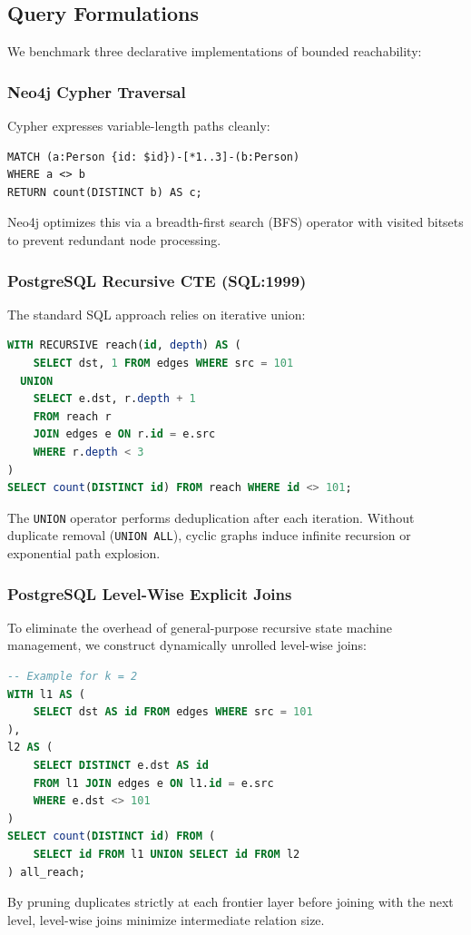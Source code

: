 \documentclass[conference,10pt]{IEEEtran}%
\begin{document}
\subsection{Query Formulations}
We benchmark three declarative implementations of bounded reachability:

\subsubsection{Neo4j Cypher Traversal}
Cypher expresses variable-length paths cleanly:
\begin{lstlisting}
MATCH (a:Person {id: $id})-[*1..3]-(b:Person)
WHERE a <> b
RETURN count(DISTINCT b) AS c;
\end{lstlisting}
Neo4j optimizes this via a breadth-first search (BFS) operator with visited bitsets to prevent redundant node processing.

\subsubsection{PostgreSQL Recursive CTE (SQL:1999)}
The standard SQL approach relies on iterative union:
\begin{lstlisting}[language=SQL]
WITH RECURSIVE reach(id, depth) AS (
    SELECT dst, 1 FROM edges WHERE src = 101
  UNION
    SELECT e.dst, r.depth + 1
    FROM reach r
    JOIN edges e ON r.id = e.src
    WHERE r.depth < 3
)
SELECT count(DISTINCT id) FROM reach WHERE id <> 101;
\end{lstlisting}
The \texttt{UNION} operator performs deduplication after each iteration. Without duplicate removal (\texttt{UNION ALL}), cyclic graphs induce infinite recursion or exponential path explosion.

\subsubsection{PostgreSQL Level-Wise Explicit Joins}
To eliminate the overhead of general-purpose recursive state machine management, we construct dynamically unrolled level-wise joins:
\begin{lstlisting}[language=SQL]
-- Example for k = 2
WITH l1 AS (
    SELECT dst AS id FROM edges WHERE src = 101
),
l2 AS (
    SELECT DISTINCT e.dst AS id
    FROM l1 JOIN edges e ON l1.id = e.src
    WHERE e.dst <> 101
)
SELECT count(DISTINCT id) FROM (
    SELECT id FROM l1 UNION SELECT id FROM l2
) all_reach;
\end{lstlisting}
By pruning duplicates strictly at each frontier layer before joining with the next level, level-wise joins minimize intermediate relation size.
\end{document}
